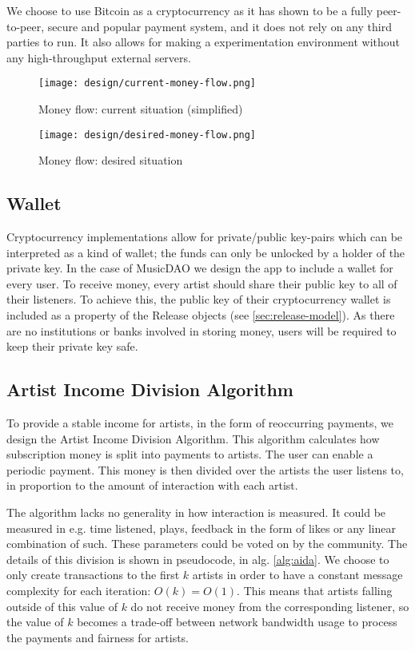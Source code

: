 We choose to use Bitcoin as a cryptocurrency as it has shown to be a fully peer-to-peer, secure and popular payment system, and it does not rely on any third parties to run. It also allows for making a experimentation environment without any high-throughput external servers. 

\begin{figure}
        \texttt{[image: design/current-money-flow.png]}
        \caption{Money flow: current situation (simplified)}
        \label{fig:current-money-flow}
    \endminipage\hfill
        \texttt{[image: design/desired-money-flow.png]}
        \caption{Money flow: desired situation}
        \label{fig:desired-money-flow}
    \endminipage
\end{figure}
\subsection{Wallet}
Cryptocurrency implementations allow for private/public key-pairs which can be interpreted as a kind of wallet; the funds can only be unlocked by a holder of the private key. In the case of MusicDAO we design the app to include a wallet for every user. To receive money, every artist should share their public key to all of their listeners. To achieve this, the public key of their cryptocurrency wallet is included as a property of the Release objects (see \ref{sec:release-model}). As there are no institutions or banks involved in storing money, users will be required to keep their private key safe.

\subsection{Artist Income Division Algorithm}
\label{sec:aida-design}
To provide a stable income for artists, in the form of reoccurring payments, we design the Artist Income Division Algorithm. This algorithm calculates how subscription money is split into payments to artists. The user can enable a periodic payment. This money is then divided over the artists the user listens to, in proportion to the amount of interaction with each artist. %

The algorithm lacks no generality in how interaction is measured. It could be measured in e.g. time listened, plays, feedback in the form of likes or any linear combination of such. These parameters could be voted on by the community. The details of this division is shown in pseudocode, in alg. \ref{alg:aida}. We choose to only create transactions to the first $k$ artists in order to have a constant message complexity for each iteration: $O(k) = O(1)$. This means that artists falling outside of this value of $k$ do not receive money from the corresponding listener, so the value of $k$ becomes a trade-off between network bandwidth usage to process the payments and fairness for artists.


